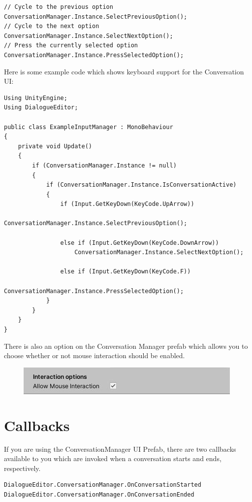 \documentclass[a4paper,12pt]{article}
\begin{document}
\begin{lstlisting}
// Cycle to the previous option
ConversationManager.Instance.SelectPreviousOption();
// Cycle to the next option
ConversationManager.Instance.SelectNextOption();
// Press the currently selected option
ConversationManager.Instance.PressSelectedOption();
\end{lstlisting}
\bigskip

Here is some example code which shows keyboard support for the Conversation UI:
\bigskip

\begin{lstlisting}
Using UnityEngine;
Using DialogueEditor;

public class ExampleInputManager : MonoBehaviour
{
	private void Update()	
	{
		if (ConversationManager.Instance != null)
		{
			if (ConversationManager.Instance.IsConversationActive)
			{
				if (Input.GetKeyDown(KeyCode.UpArrow))
					ConversationManager.Instance.SelectPreviousOption();
					    
				else if (Input.GetKeyDown(KeyCode.DownArrow))
					ConversationManager.Instance.SelectNextOption();
					
				else if (Input.GetKeyDown(KeyCode.F))
					ConversationManager.Instance.PressSelectedOption();
			}
		}
	}
}
\end{lstlisting}
\bigskip

There is also an option on the Conversation Manager prefab which allows you to choose whether or not mouse interaction should be enabled.

\begin{figure}[ht]
\centering
\includegraphics[keepaspectratio]{img/AllowMouseInteraction.png}
\end{figure}

\newpage

\section{Callbacks}
\hypertarget{_callbacks}{}

If you are using the ConversationManager UI Prefab, there are two callbacks available to you which are invoked when a conversation starts and ends, respectively.
\bigskip

\begin{lstlisting}
DialogueEditor.ConversationManager.OnConversationStarted
DialogueEditor.ConversationManager.OnConversationEnded
\end{lstlisting}
\bigskip
\end{document}
